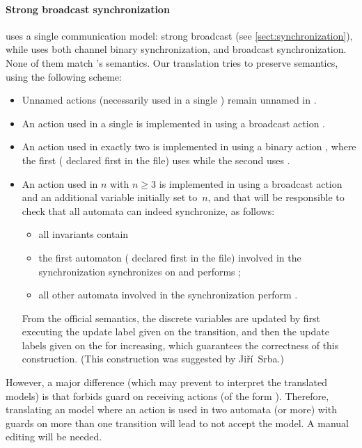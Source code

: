 \paragraph{Strong broadcast synchronization}
\imitator{} uses a single communication model: strong broadcast (see \cref{sect:synchronization}), while \uppaal{} uses both channel binary synchronization, and broadcast synchronization.
None of them match \imitator{}'s semantics.
Our translation tries to preserve \imitator{} semantics, using the following scheme:
\begin{itemize}
	\item Unnamed actions (necessarily used in a single \IPTA{}) remain unnamed in \uppaal{}.
	\item An action  used in a single \IPTA{} is implemented in \uppaal{} using a broadcast action .
	\item An action  used in exactly two \IPTA{} is implemented in \uppaal{} using a binary action , where the first (\ie{} declared first in the \imitator{} file) uses  while the second uses .
	\item An action  used in $n$ \IPTA{} with $n \geq 3$ is implemented in \uppaal{} using a broadcast action  and an additional variable  initially set to~$n$, and that will be responsible to check that all automata can indeed synchronize, as follows:
	      \begin{itemize}
		      \item all invariants contain 
		      \item the first automaton (\ie{} declared first in the \imitator{} file) involved in the synchronization synchronizes on  and performs ;
		      \item all other automata involved in the synchronization perform .
	      \end{itemize}
	      From the \uppaal{} official semantics, the discrete variables are updated by first executing the update label given on the  transition, and then the update labels given on the  for increasing, which guarantees the correctness of this construction.
	      (This construction was suggested by Jiří~Srba.)
\end{itemize}
However, a major difference (which may prevent \uppaal{} to interpret the translated models) is that \uppaal{} forbids guard on receiving actions (of the form ).
Therefore, translating an \imitator{} model where an action  is used in two automata (or more) with guards on more than one transition will lead \uppaal{} to not accept the model.
A manual editing will be needed.

